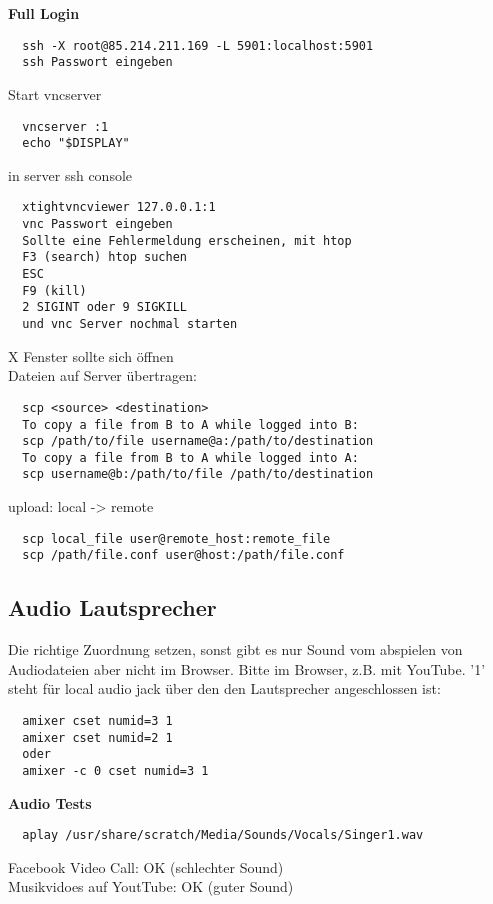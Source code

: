 \textbf{Full Login}
\begin{verbatim}
  ssh -X root@85.214.211.169 -L 5901:localhost:5901
  ssh Passwort eingeben
\end{verbatim}
Start vncserver
\begin{verbatim}
  vncserver :1
  echo "$DISPLAY"
\end{verbatim}
in server ssh console
\begin{verbatim}
  xtightvncviewer 127.0.0.1:1
  vnc Passwort eingeben
  Sollte eine Fehlermeldung erscheinen, mit htop
  F3 (search) htop suchen 
  ESC
  F9 (kill)
  2 SIGINT oder 9 SIGKILL
  und vnc Server nochmal starten
\end{verbatim}
X Fenster sollte sich öffnen\\

Dateien auf Server übertragen:
\begin{verbatim}
  scp <source> <destination>
  To copy a file from B to A while logged into B:
  scp /path/to/file username@a:/path/to/destination
  To copy a file from B to A while logged into A:
  scp username@b:/path/to/file /path/to/destination
\end{verbatim}
upload: local -> remote
\begin{verbatim}
  scp local_file user@remote_host:remote_file
  scp /path/file.conf user@host:/path/file.conf
\end{verbatim}


\subsection{Audio Lautsprecher}

Die richtige Zuordnung setzen, sonst gibt es nur Sound vom 
abspielen von Audiodateien aber nicht im Browser. Bitte im 
Browser, z.B. mit YouTube. '1' steht für local audio jack über 
den den Lautsprecher angeschlossen ist:
\begin{verbatim}
  amixer cset numid=3 1
  amixer cset numid=2 1
  oder
  amixer -c 0 cset numid=3 1
\end{verbatim}

\textbf{Audio Tests}
\begin{verbatim}
  aplay /usr/share/scratch/Media/Sounds/Vocals/Singer1.wav
\end{verbatim}
Facebook Video Call: OK (schlechter Sound)\\
Musikvidoes auf YoutTube: OK (guter Sound)\\

